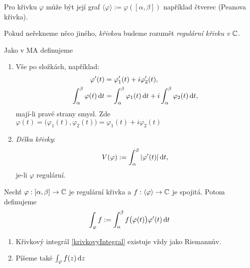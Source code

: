 \begin{note}
Pro křivku $\varphi$ může být její graf $\langle\varphi\rangle:=\varphi([\alpha,\beta])$ například čtverec (Peanova křivka).
\end{note}

\begin{agreement}
Pokud neřekneme něco jiného, \emph{křivkou} budeme rozumět \emph{regulární křivku v $\operatorname{\mathbb{C}}  $}. %
\end{agreement}

\begin{reminder}
Jako v MA definujeme
\begin{enumerate}
    \item Vše po složkách, například:
    \begin{align*}
        \varphi'(t)&=\varphi'_1(t)+i\varphi'_2(t),\\
        \int_\alpha^\beta\varphi(t)\mathop{}\!\mathrm{d} t &=\int_\alpha^\beta\varphi_1(t)\mathop{}\!\mathrm{d} t +i\int_\alpha^\beta\varphi_2(t)\mathop{}\!\mathrm{d} t,
    \end{align*}
    mají-li pravé strany smysl. Zde $\varphi(t)=\big(\varphi_1(t),\varphi_2(t)\big)=\varphi_1(t)+i\varphi_2(t)$
    \item \emph{Délka křivky}: \[V(\varphi):=\int_\alpha^\beta|\varphi'(t)|\mathop{}\!\mathrm{d} t,\] je-li $\varphi$ regulární.
\end{enumerate}
\end{reminder}
\begin{definition}
Nechť $\varphi:[\alpha,\beta]\rightarrow\operatorname{\mathbb{C}}  $ je regulární křivka a $f:\langle\varphi\rangle\rightarrow\operatorname{\mathbb{C}}  $ je spojitá. Potom definujeme
\begin{equation}\label{krivkovyIntegral}
    \int_\varphi f:=\int_\alpha^\beta f\big(\varphi(t)\big)\varphi'(t)\mathop{}\!\mathrm{d} t
\end{equation}
\end{definition}
\begin{note}
\mbox{} %
\begin{enumerate}
    \item Křivkový integrál \cref{krivkovyIntegral} existuje vždy jako Riemannův.
    \item Píšeme také $\int_\varphi f(z)\mathop{}\!\mathrm{d} z$%
\end{enumerate}
\end{note}
\newpage
